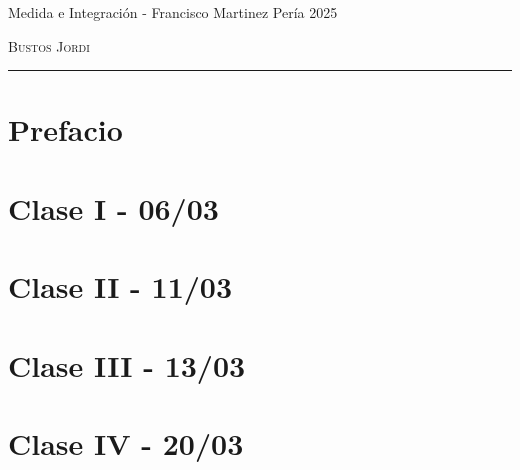 \documentclass[12pt,a4paper]{book}
\begin{document}
\renewcommand{\contentsname}{\vspace{0cm} Contenido \vspace{-2cm}}

\begin{titlepage}
    \vspace*{2cm}

    \noindent
    \vspace*{0.5cm}

    \vspace{1.5cm}
    \epigraph{Medida e Integración - Francisco Martinez Pería 2025}%
    {\textsc{Bustos Jordi}}
    \null\vfill
    \vspace*{1cm}
    \noindent
    \hfill
    \begin{minipage}{0.7\linewidth}
        \begin{flushright}
            \printauthor
        \end{flushright}
    \end{minipage}
    \begin{minipage}{0.02\linewidth}
        \rule{1pt}{70pt}
    \end{minipage}
    \titlepagedecoration
\end{titlepage}

\let\cleardoublepage=\clearpage
\tableofcontents
\blankpage

\chapter*{Prefacio}


\chapter{Clase I - 06/03 }


\chapter{Clase II - 11/03 }


\chapter{Clase III - 13/03 }


\chapter{Clase IV - 20/03 }

\end{document}
